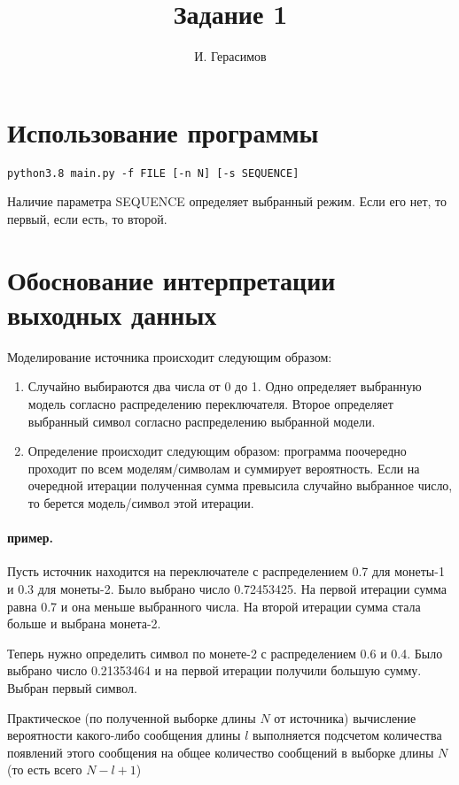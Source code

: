 \documentclass{article}
\title{Задание 1}
\author{И. Герасимов}
\date{}
\begin{document}
\maketitle

\section{Использование программы}

\begin{verbatim}
python3.8 main.py -f FILE [-n N] [-s SEQUENCE]
\end{verbatim}

Наличие параметра SEQUENCE определяет выбранный режим. Если его нет, то первый, если есть, то второй. 

\section{Обоснование интерпретации выходных данных}
	Моделирование источника происходит следующим образом:
	\begin{enumerate}
		\item Случайно выбираются два числа от 0 до 1.
		Одно определяет выбранную модель согласно распределению переключателя.
		Второе определяет выбранный символ согласно распределению выбранной модели.
		\item Определение происходит следующим образом: программа поочередно проходит по всем моделям/символам и суммирует вероятность.
		Если на очередной итерации полученная сумма превысила случайно выбранное число, то берется модель/символ этой итерации.
	\end{enumerate}
	
	\paragraph{пример.} Пусть источник находится на переключателе с распределением 0.7 для монеты-1 и 0.3 для монеты-2.
	Было выбрано число 0.72453425. На первой итерации сумма равна 0.7 и она меньше выбранного числа. На второй итерации сумма стала больше и выбрана монета-2.
	
	Теперь нужно определить символ по монете-2 с распределением 0.6 и 0.4. Было выбрано число 0.21353464 и на первой итерации получили большую сумму. Выбран первый символ.
	
	Практическое (по полученной выборке длины $N$ от источника) вычисление вероятности какого-либо сообщения длины $l$ выполняется подсчетом количества появлений этого сообщения на общее количество сообщений в выборке длины $N$ (то есть всего $N - l + 1$)
	
\end{document}
